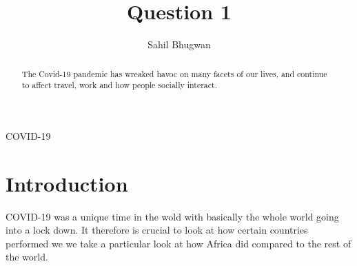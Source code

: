 \documentclass[12pt,preprint, authoryear]{elsarticle}
\numberwithin{equation}{section}
\numberwithin{figure}{section}
\numberwithin{table}{section}
\begin{document}
\begin{frontmatter}  %

\title{Question 1}





\author[Add1]{Sahil Bhugwan}





\address[Add1]{Github-\url{https://github.com/SBhugwan}}


\begin{abstract}
\small{
The Covid-19 pandemic has wreaked havoc on many facets of our lives, and
continue to affect travel, work and how people socially interact.
}
\end{abstract}

\vspace{1cm}


\begin{keyword}
\footnotesize{
COVID-19 \\
\vspace{0.3cm}
}
\end{keyword}



\vspace{0.5cm}

\end{frontmatter}



\pagestyle{fancy}
\chead{}
\rhead{}
\lfoot{}
\lhead{}
\cfoot{}


\headsep 35pt %




\hypertarget{introduction}{%
\section{\texorpdfstring{Introduction
\label{Introduction}}{Introduction }}\label{introduction}}

COVID-19 was a unique time in the wold with basically the whole world
going into a lock down. It therefore is crucial to look at how certain
countries performed we we take a particular look at how Africa did
compared to the rest of the world.
\end{document}

